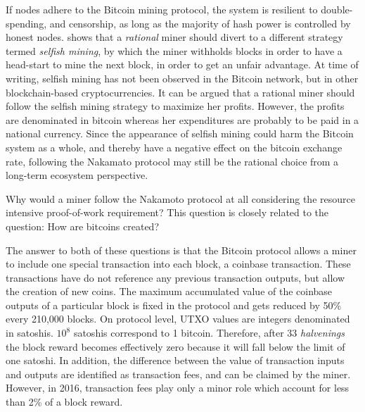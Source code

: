 If nodes adhere to the Bitcoin mining protocol, the system is resilient to double-spending, and censorship, as long as the majority of hash power is controlled by honest nodes. \cite{Eyal2014} shows that a \emph{rational} miner should divert to a different strategy termed \emph{selfish mining}, by which the miner withholds blocks in order to have a head-start to mine the next block, in order to get an unfair advantage. At time of writing, selfish mining has not been observed in the Bitcoin network, but in other blockchain-based cryptocurrencies. It can be argued that a rational miner should follow the selfish mining strategy to maximize her profits. However, the profits are denominated in bitcoin whereas her expenditures are probably to be paid in a national currency. Since the appearance of selfish mining could harm the Bitcoin system as a whole, and thereby have a negative effect on the bitcoin exchange rate, following the Nakamato protocol may still be the rational choice from a long-term ecosystem perspective. 


Why would a miner follow the Nakamoto protocol at all considering the resource intensive proof-of-work requirement? This question is closely related to the question: How are bitcoins created?

The answer to both of these questions is that the Bitcoin protocol allows a miner to include one special transaction into each block, a coinbase transaction. These transactions have do not reference any previous transaction outputs, but allow the creation of new coins. The maximum accumulated value of the coinbase outputs of a particular block is fixed in the protocol and gets reduced by 50\% every 210,000 blocks. On protocol level, \ac{UTXO} values are integers denominated in satoshis. $10^8$ satoshis correspond to 1 bitcoin. Therefore, after 33 \emph{halvenings} the block reward becomes effectively zero because it will fall below the limit of one satoshi. In addition, the difference between the value of transaction inputs and outputs are identified as transaction fees, and can be claimed by the miner. However, in 2016, transaction fees play only a minor role which account for less than 2\% of a block reward.

